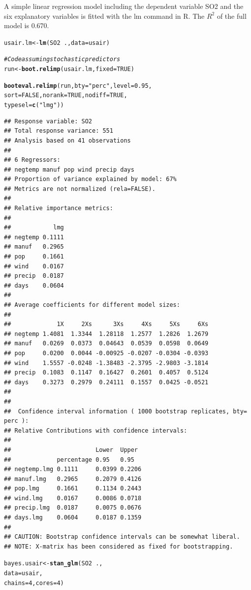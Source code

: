 \documentclass[11pt,a4paper,twoside]{book}\usepackage[]{graphicx}\usepackage[]{color}
\makeatletter
\newcommand{\hlnum}[1]{\textcolor[rgb]{0.686,0.059,0.569}{#1}}%
\newcommand{\hlstr}[1]{\textcolor[rgb]{0.192,0.494,0.8}{#1}}%
\newcommand{\hlcom}[1]{\textcolor[rgb]{0.678,0.584,0.686}{\textit{#1}}}%
\newcommand{\hlopt}[1]{\textcolor[rgb]{0,0,0}{#1}}%
\newcommand{\hlstd}[1]{\textcolor[rgb]{0.345,0.345,0.345}{#1}}%
\newcommand{\hlkwb}[1]{\textcolor[rgb]{0.69,0.353,0.396}{#1}}%
\newcommand{\hlkwc}[1]{\textcolor[rgb]{0.333,0.667,0.333}{#1}}%
\newcommand{\hlkwd}[1]{\textcolor[rgb]{0.737,0.353,0.396}{\textbf{#1}}}%
\newenvironment{kframe}{%
 \def\at@end@of@kframe{}%
 \ifinner\ifhmode%
  \def\at@end@of@kframe{\end{minipage}}%
  \begin{minipage}{\columnwidth}%
 \fi\fi%
 \def\FrameCommand##1{\hskip\@totalleftmargin \hskip-\fboxsep
 \colorbox{shadecolor}{##1}\hskip-\fboxsep
     \hskip-\linewidth \hskip-\@totalleftmargin \hskip\columnwidth}%
 \MakeFramed {\advance\hsize-\width
   \@totalleftmargin\z@ \linewidth\hsize
   \@setminipage}}%
 {\par\unskip\endMakeFramed%
 \at@end@of@kframe}
\newenvironment{knitrout}{}{} %
\makeatother
\begin{document}
A simple linear regression model including the dependent variable SO2 and the six explanatory variables is fitted with the lm command in R. The $R^2$ of the full model is 0.670. 

\begin{knitrout}
\color{fgcolor}\begin{kframe}
\begin{alltt}
\hlstd{usair.lm} \hlkwb{<-} \hlkwd{lm}\hlstd{(SO2}\hlopt{~}\hlstd{.,} \hlkwc{data} \hlstd{= usair)}


\hlcom{#Code assuming stochastic predictors}
\hlstd{run}\hlkwb{<-}\hlkwd{boot.relimp}\hlstd{(usair.lm,} \hlkwc{fixed}\hlstd{=}\hlnum{TRUE}\hlstd{)}

\hlkwd{booteval.relimp}\hlstd{(run,} \hlkwc{bty} \hlstd{=} \hlstr{"perc"}\hlstd{,} \hlkwc{level} \hlstd{=} \hlnum{0.95}\hlstd{,}
                \hlkwc{sort} \hlstd{=} \hlnum{FALSE}\hlstd{,} \hlkwc{norank} \hlstd{=} \hlnum{TRUE}\hlstd{,} \hlkwc{nodiff} \hlstd{=} \hlnum{TRUE}\hlstd{,}
                \hlkwc{typesel} \hlstd{=} \hlkwd{c}\hlstd{(}\hlstr{"lmg"}\hlstd{))}
\end{alltt}
\begin{verbatim}
## Response variable: SO2 
## Total response variance: 551 
## Analysis based on 41 observations 
## 
## 6 Regressors: 
## negtemp manuf pop wind precip days 
## Proportion of variance explained by model: 67%
## Metrics are not normalized (rela=FALSE). 
## 
## Relative importance metrics: 
## 
##            lmg
## negtemp 0.1111
## manuf   0.2965
## pop     0.1661
## wind    0.0167
## precip  0.0187
## days    0.0604
## 
## Average coefficients for different model sizes: 
## 
##             1X     2Xs      3Xs     4Xs     5Xs     6Xs
## negtemp 1.4081  1.3344  1.28118  1.2577  1.2826  1.2679
## manuf   0.0269  0.0373  0.04643  0.0539  0.0598  0.0649
## pop     0.0200  0.0044 -0.00925 -0.0207 -0.0304 -0.0393
## wind    1.5557 -0.0248 -1.38483 -2.3795 -2.9803 -3.1814
## precip  0.1083  0.1147  0.16427  0.2601  0.4057  0.5124
## days    0.3273  0.2979  0.24111  0.1557  0.0425 -0.0521
## 
##  
##  Confidence interval information ( 1000 bootstrap replicates, bty= perc ): 
## Relative Contributions with confidence intervals: 
##  
##                        Lower  Upper
##             percentage 0.95   0.95  
## negtemp.lmg 0.1111     0.0399 0.2206
## manuf.lmg   0.2965     0.2079 0.4126
## pop.lmg     0.1661     0.1134 0.2443
## wind.lmg    0.0167     0.0086 0.0718
## precip.lmg  0.0187     0.0075 0.0676
## days.lmg    0.0604     0.0187 0.1359
## 
## CAUTION: Bootstrap confidence intervals can be somewhat liberal. 
## NOTE: X-matrix has been considered as fixed for bootstrapping.
\end{verbatim}
\begin{alltt}
\hlstd{bayes.usair} \hlkwb{<-} \hlkwd{stan_glm}\hlstd{(SO2} \hlopt{~} \hlstd{. ,}
                  \hlkwc{data} \hlstd{= usair,}
                  \hlkwc{chains} \hlstd{=} \hlnum{4}\hlstd{,} \hlkwc{cores} \hlstd{=} \hlnum{4}\hlstd{)}


\end{alltt}
\end{kframe}
\end{knitrout}
\end{document}

